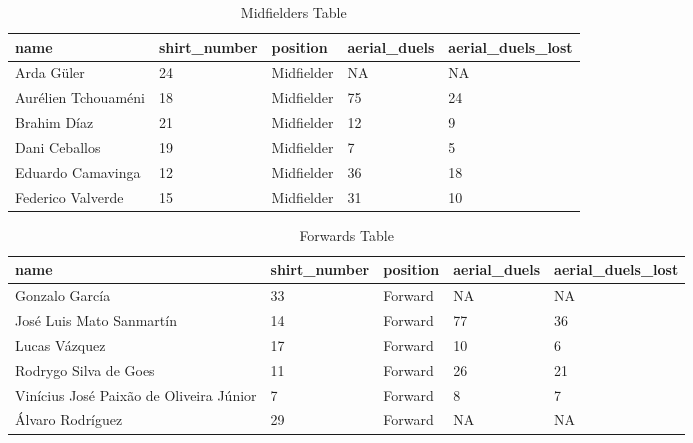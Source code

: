 \documentclass[
  6pt,
]{article}
\newenvironment{Shaded}{\begin{snugshade}}{\end{snugshade}}
\newcommand{\AttributeTok}[1]{\textcolor[rgb]{0.13,0.29,0.53}{#1}}
\newcommand{\CommentTok}[1]{\textcolor[rgb]{0.56,0.35,0.01}{\textit{#1}}}
\newcommand{\ConstantTok}[1]{\textcolor[rgb]{0.56,0.35,0.01}{#1}}
\newcommand{\DecValTok}[1]{\textcolor[rgb]{0.00,0.00,0.81}{#1}}
\newcommand{\FunctionTok}[1]{\textcolor[rgb]{0.13,0.29,0.53}{\textbf{#1}}}
\newcommand{\NormalTok}[1]{#1}
\newcommand{\OtherTok}[1]{\textcolor[rgb]{0.56,0.35,0.01}{#1}}
\newcommand{\SpecialCharTok}[1]{\textcolor[rgb]{0.81,0.36,0.00}{\textbf{#1}}}
\newcommand{\StringTok}[1]{\textcolor[rgb]{0.31,0.60,0.02}{#1}}
\begin{document}
\begin{longtable}[l]{lllll}
\caption{\label{tab:Midfielder}Midfielders Table}\\
\toprule
name & shirt\_number & position & aerial\_duels & aerial\_duels\_lost\\
\midrule
Arda Güler & 24 & Midfielder & NA & NA\\
Aurélien Tchouaméni & 18 & Midfielder & 75 & 24\\
Brahim Díaz & 21 & Midfielder & 12 & 9\\
Dani Ceballos & 19 & Midfielder & 7 & 5\\
Eduardo Camavinga & 12 & Midfielder & 36 & 18\\
\addlinespace
Federico Valverde & 15 & Midfielder & 31 & 10\\
\bottomrule
\end{longtable}

\begin{Shaded}
\end{Shaded}

\begin{longtable}[l]{lllll}
\caption{\label{tab:Forward}Forwards Table}\\
\toprule
name & shirt\_number & position & aerial\_duels & aerial\_duels\_lost\\
\midrule
Gonzalo García & 33 & Forward & NA & NA\\
José Luis Mato Sanmartín & 14 & Forward & 77 & 36\\
Lucas Vázquez & 17 & Forward & 10 & 6\\
Rodrygo Silva de Goes & 11 & Forward & 26 & 21\\
Vinícius José Paixão de Oliveira Júnior & 7 & Forward & 8 & 7\\
\addlinespace
Álvaro Rodríguez & 29 & Forward & NA & NA\\
\bottomrule
\end{longtable}
\end{document}
